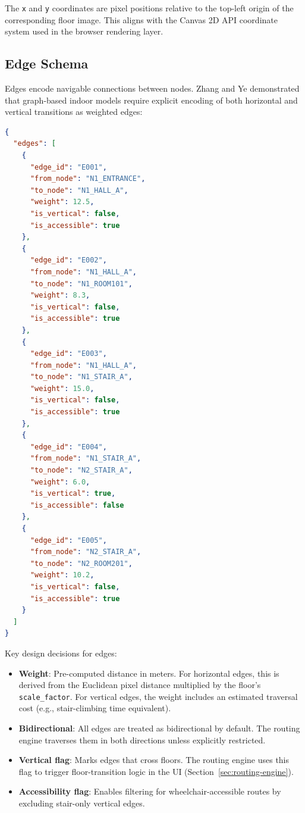 The \texttt{x} and \texttt{y} coordinates are pixel positions relative to the top-left origin of the corresponding floor image. This aligns with the Canvas 2D API coordinate system used in the browser rendering layer.

\subsection{Edge Schema}

Edges encode navigable connections between nodes. Zhang and Ye \cite{Zhang2017} demonstrated that graph-based indoor models require explicit encoding of both horizontal and vertical transitions as weighted edges:

\begin{lstlisting}[language=json, caption={Edge data structure}]
{
  "edges": [
    {
      "edge_id": "E001",
      "from_node": "N1_ENTRANCE",
      "to_node": "N1_HALL_A",
      "weight": 12.5,
      "is_vertical": false,
      "is_accessible": true
    },
    {
      "edge_id": "E002",
      "from_node": "N1_HALL_A",
      "to_node": "N1_ROOM101",
      "weight": 8.3,
      "is_vertical": false,
      "is_accessible": true
    },
    {
      "edge_id": "E003",
      "from_node": "N1_HALL_A",
      "to_node": "N1_STAIR_A",
      "weight": 15.0,
      "is_vertical": false,
      "is_accessible": true
    },
    {
      "edge_id": "E004",
      "from_node": "N1_STAIR_A",
      "to_node": "N2_STAIR_A",
      "weight": 6.0,
      "is_vertical": true,
      "is_accessible": false
    },
    {
      "edge_id": "E005",
      "from_node": "N2_STAIR_A",
      "to_node": "N2_ROOM201",
      "weight": 10.2,
      "is_vertical": false,
      "is_accessible": true
    }
  ]
}
\end{lstlisting}

Key design decisions for edges:

\begin{itemize}
  \item \textbf{Weight}: Pre-computed distance in meters. For horizontal edges, this is derived from the Euclidean pixel distance multiplied by the floor's \texttt{scale\_factor}. For vertical edges, the weight includes an estimated traversal cost (e.g., stair-climbing time equivalent).
  \item \textbf{Bidirectional}: All edges are treated as bidirectional by default. The routing engine traverses them in both directions unless explicitly restricted.
  \item \textbf{Vertical flag}: Marks edges that cross floors. The routing engine uses this flag to trigger floor-transition logic in the UI (Section~\ref{sec:routing-engine}).
  \item \textbf{Accessibility flag}: Enables filtering for wheelchair-accessible routes by excluding stair-only vertical edges.
\end{itemize}

